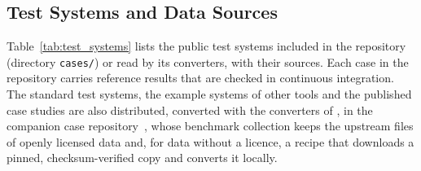 \subsection{Test Systems and Data Sources}
\label{sec:test_systems}

Table~\ref{tab:test_systems} lists the public test systems included in
the repository (directory \texttt{cases/}) or read by its converters,
with their sources.  Each case in the repository carries reference
results that are checked in continuous integration.  The standard test
systems, the example systems of other tools and the published case
studies are also distributed, converted with the converters of
\gtopt{}, in the companion case repository~\cite{gtoptcases}, whose
benchmark collection keeps the upstream files of openly licensed data
and, for data without a licence, a recipe that downloads a pinned,
checksum-verified copy and converts it locally.


